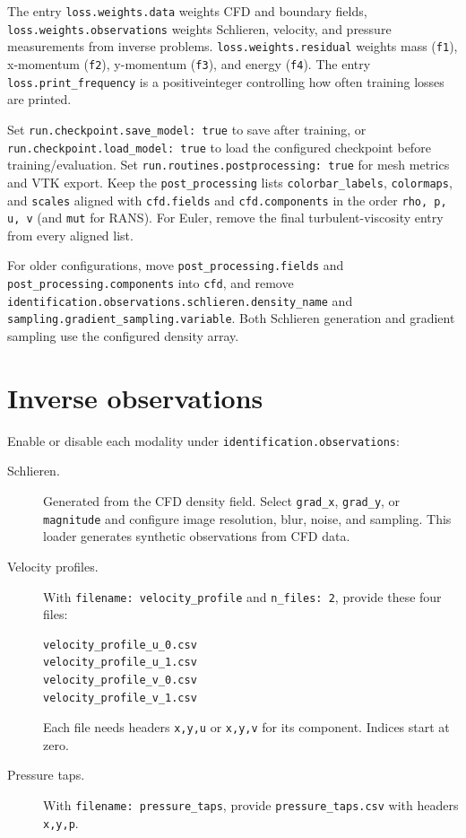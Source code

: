 \documentclass[11pt,a4paper]{article}
\newcommand{\code}[1]{\nolinkurl{#1}}
\begin{document}
The entry \code{loss.weights.data} weights CFD and boundary fields, 
\code{loss.weights.observations} weights Schlieren, velocity, and pressure
measurements from inverse problems. \code{loss.weights.residual} weights mass 
(\code{f1}), x-momentum (\code{f2}), y-momentum (\code{f3}), and energy (\code{f4}). 
The entry \code{loss.print_frequency} is a positiveinteger controlling how often 
training losses are printed.

Set \code{run.checkpoint.save_model: true} to save after training, or
\code{run.checkpoint.load_model: true} to load the configured checkpoint before
training/evaluation. Set \code{run.routines.postprocessing: true} for mesh metrics
and VTK export. Keep the \code{post_processing} lists \code{colorbar_labels},
\code{colormaps}, and \code{scales} aligned with \code{cfd.fields} and
\code{cfd.components} in the order \code{rho, p, u, v} (and \code{mut} for
RANS). For Euler, remove the final turbulent-viscosity entry from every aligned
list.

For older configurations, move \code{post_processing.fields} and
\code{post_processing.components} into \code{cfd}, and remove
\code{identification.observations.schlieren.density_name} and
\code{sampling.gradient_sampling.variable}. Both Schlieren generation and
gradient sampling use the configured density array.

\section{Inverse observations}
\label{sec:observations}

Enable or disable each modality under \code{identification.observations}:

\begin{description}
  \item[Schlieren.]
    Generated from the CFD density field. Select \code{grad_x},
    \code{grad_y}, or \code{magnitude} and configure image resolution, blur,
    noise, and sampling. This loader generates synthetic observations from
    CFD data.
  \item[Velocity profiles.]
    With \code{filename: velocity_profile} and \code{n_files: 2}, provide
    these four files:
\begin{lstlisting}
velocity_profile_u_0.csv
velocity_profile_u_1.csv
velocity_profile_v_0.csv
velocity_profile_v_1.csv
\end{lstlisting}
    Each file needs headers \code{x,y,u} or \code{x,y,v} for its component.
    Indices start at zero.
  \item[Pressure taps.]
    With \code{filename: pressure_taps}, provide \code{pressure_taps.csv}
    with headers \code{x,y,p}.
\end{description}
\end{document}
